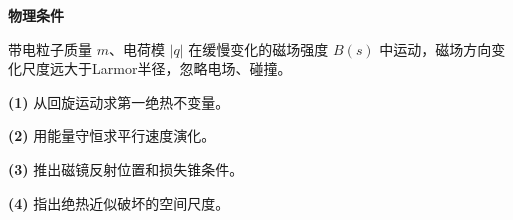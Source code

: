 \textbf{物理条件}\par 带电粒子质量 \(m\)、电荷模 \(|q|\) 在缓慢变化的磁场强度 \(B(s)\) 中运动，磁场方向变化尺度远大于Larmor半径，忽略电场、碰撞。
\par\noindent\textbf{(1)} 从回旋运动求第一绝热不变量。
\par\noindent\textbf{(2)} 用能量守恒求平行速度演化。
\par\noindent\textbf{(3)} 推出磁镜反射位置和损失锥条件。
\par\noindent\textbf{(4)} 指出绝热近似破坏的空间尺度。

